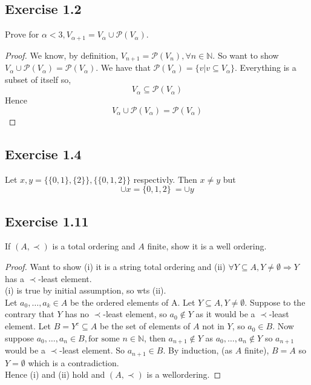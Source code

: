 \documentclass[a4paper, 12pt, twoside]{article}
\author{jdRanda}
\begin{document}
\subsection*{Exercise 1.2}
Prove for $\alpha<3, V_{\alpha+1}=V_{\alpha}\cup \mathcal{P}(V_{\alpha})$.
\begin{proof}
    We know, by definition, $V_{n+1}=\mathcal{P}(V_{n}), \forall n\in \mathbb{N}$. So want to show $V_{\alpha}\cup \mathcal{P}(V_{\alpha})=\mathcal{P}(V_{\alpha})$.
    We have that $\mathcal{P}(V_{\alpha})=\{v|v\subseteq V_{\alpha}\}$. Everything is a subset of itself so,
    $$V_{\alpha}\subseteq \mathcal{P}(V_{\alpha})$$
    Hence
    $$V_{\alpha}\cup \mathcal{P}(V_{\alpha})=\mathcal{P}(V_{\alpha})$$
\end{proof}
\subsection*{Exercise 1.4}
Let $x,y=\{\{0,1\},\{2\}\},\{\{0,1,2\}\}$ respectivly. Then $x\neq y$ but
$$\cup x= \{0,1,2\}\ = \cup y$$
\subsection*{Exercise 1.11}
If $(A,\prec)$ is a total ordering and $A$ finite, show it is a well ordering.
\begin{proof}
    Want to show (i) it is  a string total ordering and (ii) $\forall Y\subseteq A, Y\neq \emptyset\Rightarrow Y$has a $\prec$-least element.\\
    (i) is true by initial assumption, so wts (ii).\\
    Let $a_{0},\dots,a_{k}\in A$ be the ordered elements of A. Let $Y\subseteq A, Y\neq \emptyset$. Suppose to the contrary that $Y$ has no $\prec$-least element, so $a_{0}\not\in Y$ as it would be a $\prec$-least element. Let $B=Y^{c}\subseteq A$ be the set of elements of $A$ not in $Y$, so $a_{0}\in B$. Now suppose $a_{0},\dots,a_{n}\in B,\text{for some } n\in \mathbb{N}$, then $a_{n+1}\not\in Y$ as $a_{0},\dots,a_{n}\not\in Y$ so $a_{n+1}$ would be a $\prec$-least element. So $a_{n+1}\in B$. By induction, (as $A$ finite), $B=A$ so $Y=\emptyset$ which is a contradiction. \\
    Hence (i) and (ii) hold and $(A,\prec)$ is a wellordering.
\end{proof}
\end{document}
